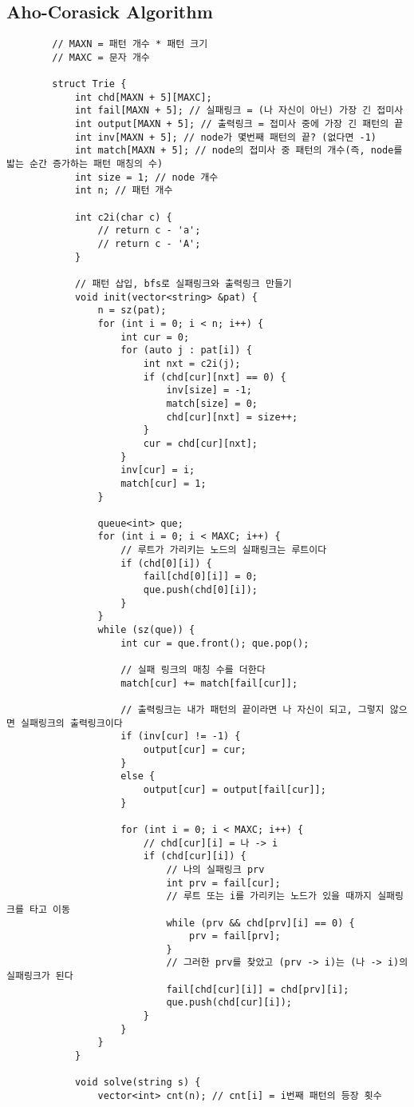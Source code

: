\documentclass[landscape, 8pt, a4paper, oneside, twocolumn]{extarticle}
\begin{document}
	\subsection{Aho-Corasick Algorithm}
	\begin{verbatim}
		// MAXN = 패턴 개수 * 패턴 크기
		// MAXC = 문자 개수
		
		struct Trie {
			int chd[MAXN + 5][MAXC];
			int fail[MAXN + 5]; // 실패링크 = (나 자신이 아닌) 가장 긴 접미사
			int output[MAXN + 5]; // 출력링크 = 접미사 중에 가장 긴 패턴의 끝
			int inv[MAXN + 5]; // node가 몇번째 패턴의 끝? (없다면 -1)
			int match[MAXN + 5]; // node의 접미사 중 패턴의 개수(즉, node를 밟는 순간 증가하는 패턴 매칭의 수)
			int size = 1; // node 개수
			int n; // 패턴 개수
			
			int c2i(char c) {
				// return c - 'a';
				// return c - 'A';
			}
			
			// 패턴 삽입, bfs로 실패링크와 출력링크 만들기
			void init(vector<string> &pat) {
				n = sz(pat);
				for (int i = 0; i < n; i++) {
					int cur = 0;
					for (auto j : pat[i]) {
						int nxt = c2i(j);
						if (chd[cur][nxt] == 0) {
							inv[size] = -1;
							match[size] = 0;
							chd[cur][nxt] = size++;
						}
						cur = chd[cur][nxt];
					}
					inv[cur] = i;
					match[cur] = 1;
				}
				
				queue<int> que;
				for (int i = 0; i < MAXC; i++) {
					// 루트가 가리키는 노드의 실패링크는 루트이다
					if (chd[0][i]) {
						fail[chd[0][i]] = 0;
						que.push(chd[0][i]);
					}
				}
				while (sz(que)) {
					int cur = que.front(); que.pop();
					
					// 실패 링크의 매칭 수를 더한다
					match[cur] += match[fail[cur]];
					
					// 출력링크는 내가 패턴의 끝이라면 나 자신이 되고, 그렇지 않으면 실패링크의 출력링크이다
					if (inv[cur] != -1) {
						output[cur] = cur;
					}
					else {
						output[cur] = output[fail[cur]];
					}
					
					for (int i = 0; i < MAXC; i++) {
						// chd[cur][i] = 나 -> i
						if (chd[cur][i]) {
							// 나의 실패링크 prv
							int prv = fail[cur];
							// 루트 또는 i를 가리키는 노드가 있을 때까지 실패링크를 타고 이동
							while (prv && chd[prv][i] == 0) {
								prv = fail[prv];
							}
							// 그러한 prv를 찾았고 (prv -> i)는 (나 -> i)의 실패링크가 된다
							fail[chd[cur][i]] = chd[prv][i];
							que.push(chd[cur][i]);
						}
					}
				}
			}
			
			void solve(string s) {
				vector<int> cnt(n); // cnt[i] = i번째 패턴의 등장 횟수
				

\end{verbatim}
\end{document}
